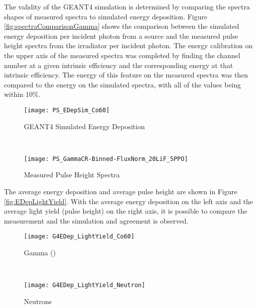 The validity of the GEANT4 simulation is determined by comparing the spectra shapes of measured spectra to simulated energy deposition.
Figure \ref{fig:spectraComparisonGamma} shows the comparison between the simulated energy deposition per incident photon from a  source and the measured pulse height spectra from the  irradiator per incident photon.
The energy calibration on the upper axis of the measured spectra was completed by finding the channel number at a given intrinsic efficiency and the corresponding energy at that intrinsic efficiency.
The energy of this feature on the measured spectra was then compared to the energy on the simulated spectra, with all of the values being within 10\%.
\begin{figure*}[ht]
	\centering
	\begin{subfigure}[b]{0.45\textwidth}
    		\texttt{[image: PS\_EDepSim\_Co60]}
		\caption{GEANT4 Simulated Energy Deposition}
	\end{subfigure}%
	~
	\begin{subfigure}[b]{0.45\textwidth}
    \texttt{[image: PS\_GammaCR-Binned-FluxNorm\_20LiF\_5PPO]}
		\caption{Measured Pulse Height Spectra}
	\end{subfigure}%
	\caption{Comparison of the energy deposition and binned pulse height spectra for validation. The spectra have the same shape, indicating agreement. The fabricated films greater than \SI{600}{\um} were of poor optical quality and therefore their results are not shown.}
	\label{fig:spectraComparisonGamma}
\end{figure*}
The average energy deposition and average pulse height are shown in Figure \ref{fig:EDepLightYield}. 
With the average energy deposition on the left axis and the average light yield (pulse height) on the right axis, it is possible to compare the measurement and the simulation and agreement is observed.
\begin{figure*}[ht]
	\centering
	\begin{subfigure}[b]{0.45\textwidth}
    		\texttt{[image: G4EDep\_LightYield\_Co60]}
		\caption{Gamma ()}
	\end{subfigure}%
	~
	\begin{subfigure}[b]{0.45\textwidth}
    		\texttt{[image: G4EDep\_LightYield\_Neutron]}
		\caption{Neutrons}
	\end{subfigure}%
	\caption{Average Energy Deposition and Measured Light Yield. The solid lines are calculated values and the red dots are measurements.}
	\label{fig:EDepLightYield}
\end{figure*}

